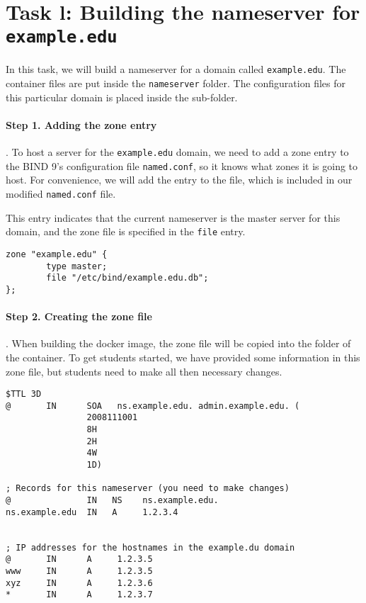 \section{Task l: Building the nameserver for \texttt{example.edu}}

In this task, we will build a nameserver for a domain 
called \texttt{example.edu}. The container files are 
put inside the \texttt{nameserver} folder. 
The configuration files for this particular domain
is placed inside the  sub-folder.  


\paragraph{Step 1. Adding the zone entry}. To host
a server for the \texttt{example.edu} domain, we need to
add a zone entry to the BIND 9's configuration file \texttt{named.conf}, 
so it knows what zones it is going to host. For convenience,
we will add the entry to the  file, which
is included in our modified \texttt{named.conf} file.


This entry indicates that the current nameserver 
is the master server for this domain, and the zone file is 
specified in the \texttt{file} entry.  


\begin{lstlisting}
zone "example.edu" {
        type master;
        file "/etc/bind/example.edu.db";
};
\end{lstlisting}


\paragraph{Step 2. Creating the zone file}. 
When building the docker image, the zone file 
 will be copied into
the  folder of the container. 
To get students started, we have provided some 
information in this zone file, but students need to make 
all then necessary changes.

\begin{lstlisting}
$TTL 3D
@       IN      SOA   ns.example.edu. admin.example.edu. (
                2008111001
                8H
                2H
                4W
                1D)

; Records for this nameserver (you need to make changes)
@               IN   NS    ns.example.edu.
ns.example.edu  IN   A     1.2.3.4


; IP addresses for the hostnames in the example.du domain
@       IN      A     1.2.3.5
www     IN      A     1.2.3.5
xyz     IN      A     1.2.3.6
*       IN      A     1.2.3.7
\end{lstlisting}
 


